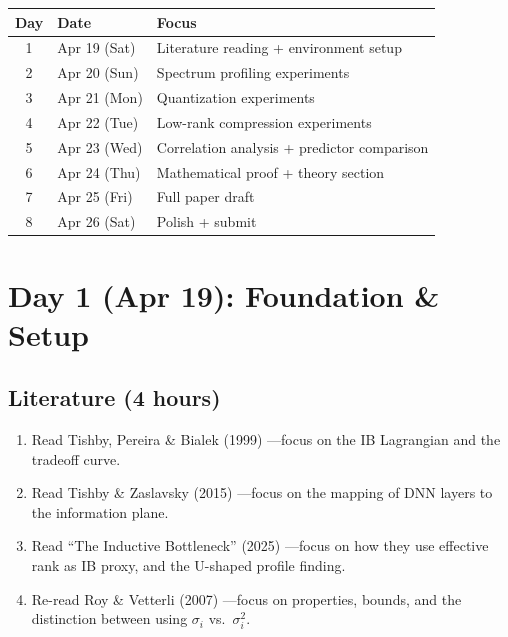 \documentclass[11pt,a4paper]{article}
\begin{document}
\begin{center}
\begin{tabular}{@{}clp{8cm}@{}}
\toprule
\textbf{Day} & \textbf{Date} & \textbf{Focus} \\
\midrule
1 & Apr 19 (Sat) & Literature reading + environment setup \\
2 & Apr 20 (Sun) & Spectrum profiling experiments \\
3 & Apr 21 (Mon) & Quantization experiments \\
4 & Apr 22 (Tue) & Low-rank compression experiments \\
5 & Apr 23 (Wed) & Correlation analysis + predictor comparison \\
6 & Apr 24 (Thu) & Mathematical proof + theory section \\
7 & Apr 25 (Fri) & Full paper draft \\
8 & Apr 26 (Sat) & Polish + submit \\
\bottomrule
\end{tabular}
\end{center}

\section{Day 1 (Apr 19): Foundation \& Setup}

\subsection{Literature (4 hours)}
\begin{enumerate}
    \item Read Tishby, Pereira \& Bialek (1999) \cite{tishby1999information}---focus on the IB Lagrangian and the tradeoff curve.
    \item Read Tishby \& Zaslavsky (2015) \cite{tishby2015deep}---focus on the mapping of DNN layers to the information plane.
    \item Read ``The Inductive Bottleneck'' (2025) \cite{inductivebottleneck2025}---focus on how they use effective rank as IB proxy, and the U-shaped profile finding.
    \item Re-read Roy \& Vetterli (2007) \cite{roy2007effective}---focus on properties, bounds, and the distinction between using $\sigma_i$ vs.\ $\sigma_i^2$.
\end{enumerate}
\end{document}
